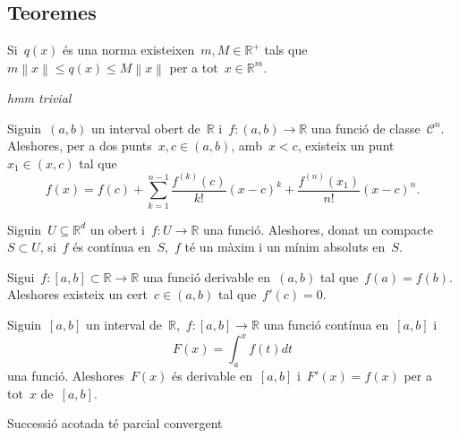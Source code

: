 \documentclass[../../main.tex]{subfiles}
\begin{document}
	\subsection{Teoremes}
	\begin{theorem}
		\label{thm:Equivalència de normes}
		Si~\(q(x)\) és una norma existeixen~\(m,M\in\mathbb{R}^{+}\) tals que~\(m\left\lVert x\right\rVert\leq q(x)\leq M\left\lVert x\right\rVert\) per a tot~\(x\in\mathbb{R}^{m}\).
	\end{theorem}
	\begin{theorem}
		\label{Teorema del Valor Mig}\label{thm:TVM}
		\emph{hmm trivial}
	\end{theorem}
	\begin{theorem}
		\label{thm:Desigualtat de C-S}
	\end{theorem}
	\begin{theorem}%
		\label{thm:Teorema de Taylor} %
		Siguin~\((a,b)\) un interval obert de~\(\mathbb{R}\) i~\(f\colon(a,b)\rightarrow\mathbb{R}\) una funció de classe~\(\mathcal{C}^{n}\).
		Aleshores, per a dos punts~\(x,c\in(a,b)\), amb~\(x<c\), existeix un punt~\(x_{1}\in(x,c)\) tal que
		\[f(x)=f(c)+\sum_{k=1}^{n-1}\frac{f^{(k)}(c)}{k!}(x-c)^{k}+\frac{f^{(n)}(x_{1})}{n!}(x-c)^{n}.\]
	\end{theorem}
	\begin{theorem}
		\label{thm:Weierstrass màxims i mínims múltiples variables}
		Siguin~\(U\subseteq\mathbb{R}^{d}\) un obert i~\(f\colon U\to\mathbb{R}\) una funció.
		Aleshores, donat un compacte~\(S\subset U\), si~\(f\) és contínua en~\(S\),~\(f\) té un màxim i un mínim absoluts en~\(S\).
	\end{theorem}
	\begin{theorem}
		\label{thm:sandvitx}
	\end{theorem}
	\begin{theorem}
		\label{thm:Teorema de Rolle}
		Sigui~\(f\colon[a,b]\subset\mathbb{R}\longrightarrow\mathbb{R}\) una funció derivable en~\((a,b)\) tal que~\(f(a)=f(b)\).
		Aleshores existeix un cert~\(c\in(a,b)\) tal que~\(f'(c)=0\).
	\end{theorem}
	\begin{theorem}
		\label{thm:Teorema Fonamental del Càlcul}
		Siguin~\([a,b]\) un interval de~\(\mathbb{R}\),~\(f\colon[a,b]\longrightarrow\mathbb{R}\) una funció contínua en~\([a,b]\) i
		\[F(x)=\int_{a}^{x}f(t)dt\]
		una funció.
		Aleshores~\(F(x)\) és derivable en~\([a,b]\) i~\(F'(x)=f(x)\) per a tot~\(x\) de~\([a,b]\).
	\end{theorem}
	\begin{theorem}
		\label{thm:Teorema de Bolzano-Weierstrass}
		Successió acotada té parcial convergent
	\end{theorem}
\end{document}

